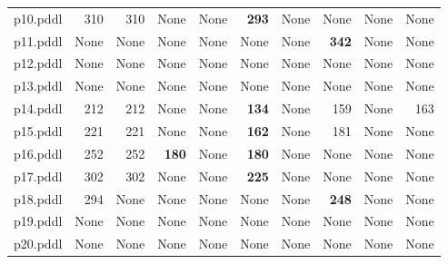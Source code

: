 \documentclass{article}
\begin{document}
\begin{tabular}{@{}lrrrrrrrrr@{}}
p10.pddl & 310 & 310 & \multicolumn{1}{|l|}{None} & \multicolumn{1}{|l|}{None} & \textbf{293} & \multicolumn{1}{|l|}{None} & \multicolumn{1}{|l|}{None} & \multicolumn{1}{|l|}{None} & \multicolumn{1}{|l|}{None} \\
p11.pddl & \multicolumn{1}{|l|}{None} & \multicolumn{1}{|l|}{None} & \multicolumn{1}{|l|}{None} & \multicolumn{1}{|l|}{None} & \multicolumn{1}{|l|}{None} & \multicolumn{1}{|l|}{None} & \textbf{342} & \multicolumn{1}{|l|}{None} & \multicolumn{1}{|l|}{None} \\
p12.pddl & \multicolumn{1}{|l|}{None} & \multicolumn{1}{|l|}{None} & \multicolumn{1}{|l|}{None} & \multicolumn{1}{|l|}{None} & \multicolumn{1}{|l|}{None} & \multicolumn{1}{|l|}{None} & \multicolumn{1}{|l|}{None} & \multicolumn{1}{|l|}{None} & \multicolumn{1}{|l|}{None} \\
p13.pddl & \multicolumn{1}{|l|}{None} & \multicolumn{1}{|l|}{None} & \multicolumn{1}{|l|}{None} & \multicolumn{1}{|l|}{None} & \multicolumn{1}{|l|}{None} & \multicolumn{1}{|l|}{None} & \multicolumn{1}{|l|}{None} & \multicolumn{1}{|l|}{None} & \multicolumn{1}{|l|}{None} \\
p14.pddl & 212 & 212 & \multicolumn{1}{|l|}{None} & \multicolumn{1}{|l|}{None} & \textbf{134} & \multicolumn{1}{|l|}{None} & 159 & \multicolumn{1}{|l|}{None} & 163 \\
p15.pddl & 221 & 221 & \multicolumn{1}{|l|}{None} & \multicolumn{1}{|l|}{None} & \textbf{162} & \multicolumn{1}{|l|}{None} & 181 & \multicolumn{1}{|l|}{None} & \multicolumn{1}{|l|}{None} \\
p16.pddl & 252 & 252 & \textbf{180} & \multicolumn{1}{|l|}{None} & \textbf{180} & \multicolumn{1}{|l|}{None} & \multicolumn{1}{|l|}{None} & \multicolumn{1}{|l|}{None} & \multicolumn{1}{|l|}{None} \\
p17.pddl & 302 & 302 & \multicolumn{1}{|l|}{None} & \multicolumn{1}{|l|}{None} & \textbf{225} & \multicolumn{1}{|l|}{None} & \multicolumn{1}{|l|}{None} & \multicolumn{1}{|l|}{None} & \multicolumn{1}{|l|}{None} \\
p18.pddl & 294 & \multicolumn{1}{|l|}{None} & \multicolumn{1}{|l|}{None} & \multicolumn{1}{|l|}{None} & \multicolumn{1}{|l|}{None} & \multicolumn{1}{|l|}{None} & \textbf{248} & \multicolumn{1}{|l|}{None} & \multicolumn{1}{|l|}{None} \\
p19.pddl & \multicolumn{1}{|l|}{None} & \multicolumn{1}{|l|}{None} & \multicolumn{1}{|l|}{None} & \multicolumn{1}{|l|}{None} & \multicolumn{1}{|l|}{None} & \multicolumn{1}{|l|}{None} & \multicolumn{1}{|l|}{None} & \multicolumn{1}{|l|}{None} & \multicolumn{1}{|l|}{None} \\
p20.pddl & \multicolumn{1}{|l|}{None} & \multicolumn{1}{|l|}{None} & \multicolumn{1}{|l|}{None} & \multicolumn{1}{|l|}{None} & \multicolumn{1}{|l|}{None} & \multicolumn{1}{|l|}{None} & \multicolumn{1}{|l|}{None} & \multicolumn{1}{|l|}{None} & \multicolumn{1}{|l|}{None} \\
\end{tabular}
\end{document}
